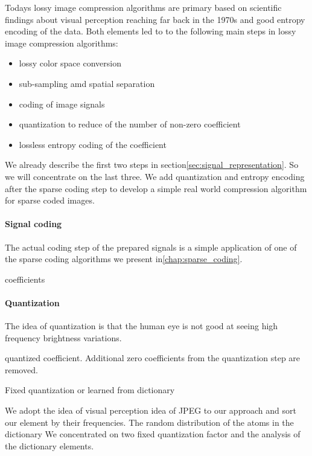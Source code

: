 Todays lossy image compression algorithms are primary based on scientific
findings about visual perception reaching far back in the 1970s\cite{?} and
good entropy encoding of the data. Both elements led to to the
following main steps in lossy image compression algorithms:
\begin{itemize}
 \item lossy color space conversion
 \item sub-sampling amd spatial separation
 \item coding of image signals
 \item quantization to reduce of the number of non-zero coefficient 
 \item lossless entropy coding of the coefficient 
\end{itemize}
We already describe the first two steps in
section\ref{sec:signal_representation}. So we will concentrate on the last
three.
We add quantization and entropy encoding after the sparse coding step to develop
a simple real world compression algorithm for sparse coded images.


\paragraph{Signal coding}
The actual coding step of the prepared signals is a simple application of one
of the sparse coding algorithms we present in\ref{chap:sparse_coding}.

coefficients

\paragraph{Quantization}
The idea of quantization is that the human eye is not good at seeing high
frequency brightness variations.

quantized coefficient. Additional zero coefficients from the quantization step
are removed.

Fixed quantization or learned from dictionary

We adopt the idea of visual perception idea of JPEG to our
approach and sort our element by their frequencies.
The random distribution of the atoms in the dictionary 
We concentrated on two fixed quantization factor and the analysis of the
dictionary elements.

